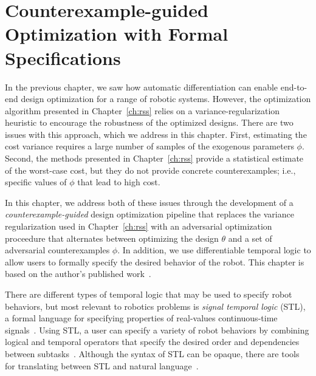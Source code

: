 \newcommand{\ieeecopyright}{\copyright 2022 IEEE}

\chapter{Counterexample-guided Optimization with Formal Specifications}\label{ch:iros}

In the previous chapter, we saw how automatic differentiation can enable end-to-end design optimization for a range of robotic systems. However, the optimization algorithm presented in Chapter~\ref{ch:rss} relies on a variance-regularization heuristic to encourage the robustness of the optimized designs. There are two issues with this approach, which we address in this chapter. First, estimating the cost variance requires a large number of samples of the exogenous parameters $\phi$. Second, the methods presented in Chapter~\ref{ch:rss} provide a statistical estimate of the worst-case cost, but they do not provide concrete counterexamples; i.e., specific values of $\phi$ that lead to high cost.

In this chapter, we address both of these issues through the development of a \textit{counterexample-guided} design optimization pipeline that replaces the variance regularization used in Chapter~\ref{ch:rss} with an adversarial optimization proceedure that alternates between optimizing the design $\theta$ and a set of adversarial counterexamples $\phi$. In addition, we use differentiable temporal logic to allow users to formally specify the desired behavior of the robot. This chapter is based on the author's published work~\cite{dawsonRobustCounterexampleguidedOptimization2022b}.

There are different types of temporal logic that may be used to specify robot behaviors, but most relevant to robotics problems is \textit{signal temporal logic} (STL), a formal language for specifying properties of real-values continuous-time signals~\cite{donzeBreachToolboxVerification2010,sunMultiagentMotionPlanning2022,pantSmoothOperatorControl2017}. Using STL, a user can specify a variety of robot behaviors by combining logical and temporal operators that specify the desired order and dependencies between subtasks~\cite{plakuMotionPlanningTemporallogic2016,sunMultiagentMotionPlanning2022,takanoContinuousOptimizationBasedTask2021}. Although the syntax of STL can be opaque, there are tools for translating between STL and natural language~\cite{chenNL2TLTransformingNatural2023}.

